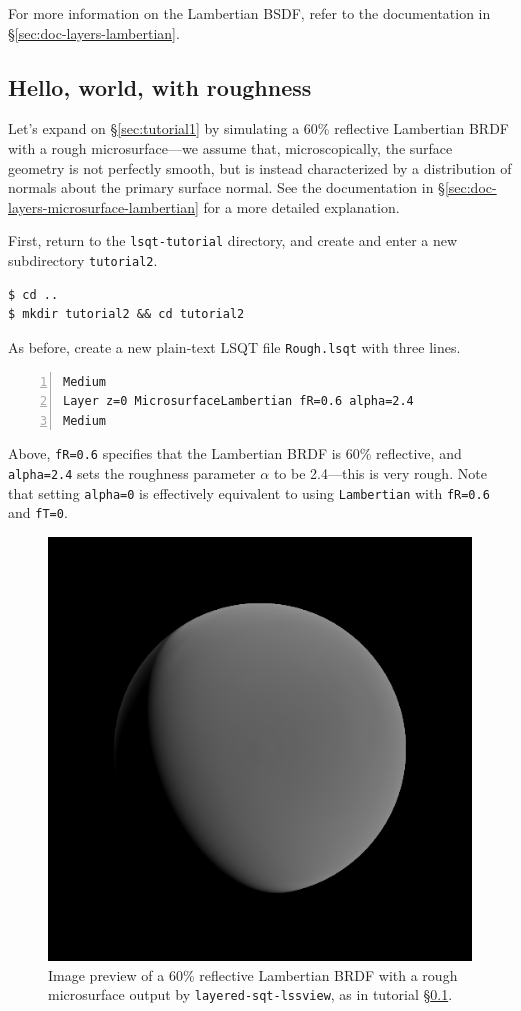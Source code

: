 \documentclass[
    twoside,
    twocolumn,
    letterpaper,
    10pt]{article}
\newcommand\namett[2]{{\color{code#1}\texttt{#2}}}
\begin{document}
For more information on the Lambertian BSDF, refer to 
the documentation in \S\ref{sec:doc-layers-lambertian}.

\subsection{Hello, world, with roughness}
\label{sec:tutorial2}

Let's expand on \S\ref{sec:tutorial1} by simulating a 60\% reflective
Lambertian BRDF with a rough microsurface---we assume that, microscopically,
the surface geometry is not perfectly smooth, but is instead characterized by 
a distribution of normals about the primary surface normal. See the 
documentation in \S\ref{sec:doc-layers-microsurface-lambertian} for a 
more detailed explanation.

First, return to the \texttt{lsqt-tutorial} directory, and create
and enter a new subdirectory \texttt{tutorial2}.
\begin{verbatim}
$ cd ..
$ mkdir tutorial2 && cd tutorial2
\end{verbatim}
As before, create a new plain-text LSQT file \texttt{Rough.lsqt} 
with three lines.
\begin{lstlisting}[numbers=left]
Medium
Layer z=0 MicrosurfaceLambertian fR=0.6 alpha=2.4
Medium
\end{lstlisting}
Above, \texttt{fR=0.6} specifies that the Lambertian BRDF is 60\% 
reflective, and \texttt{alpha=2.4} sets the roughness parameter
$\alpha$ to be 2.4---this is very rough. Note that setting 
\texttt{alpha=0} is effectively equivalent to using 
\namett{purple}{Lambertian} with \texttt{fR=0.6} 
and \texttt{fT=0}.

\begin{figure}
\begin{center}
    \includegraphics[width=0.75\columnwidth]{tutorial2.png}
    \caption{Image preview of a 60\% reflective Lambertian BRDF
    with a rough microsurface output by \texttt{layered-sqt-lssview}, as 
    in tutorial \S\ref{sec:tutorial2}.
    \label{fig:tutorial2}}
\end{center}
\end{figure}
\end{document}
